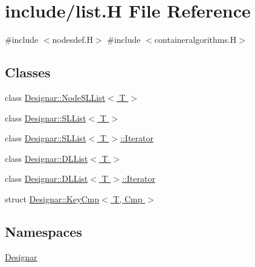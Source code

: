 \hypertarget{list_8_h}{}\section{include/list.H File Reference}
\label{list_8_h}
{\ttfamily \#include $<$nodesdef.\+H$>$}\newline
{\ttfamily \#include $<$containeralgorithms.\+H$>$}\newline
\subsection*{Classes}
\begin{DoxyCompactItemize}
\item 
class \hyperlink{class_designar_1_1_node_s_l_list}{Designar\+::\+Node\+S\+L\+List$<$ T $>$}
\item 
class \hyperlink{class_designar_1_1_s_l_list}{Designar\+::\+S\+L\+List$<$ T $>$}
\item 
class \hyperlink{class_designar_1_1_s_l_list_1_1_iterator}{Designar\+::\+S\+L\+List$<$ T $>$\+::\+Iterator}
\item 
class \hyperlink{class_designar_1_1_d_l_list}{Designar\+::\+D\+L\+List$<$ T $>$}
\item 
class \hyperlink{class_designar_1_1_d_l_list_1_1_iterator}{Designar\+::\+D\+L\+List$<$ T $>$\+::\+Iterator}
\item 
struct \hyperlink{struct_designar_1_1_key_cmp}{Designar\+::\+Key\+Cmp$<$ T, Cmp $>$}
\end{DoxyCompactItemize}
\subsection*{Namespaces}
\begin{DoxyCompactItemize}
\item 
 \hyperlink{namespace_designar}{Designar}
\end{DoxyCompactItemize}
